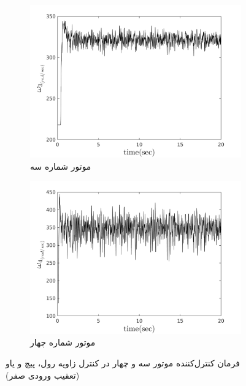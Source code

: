 \begin{figure}
	[width=12cm]
	\centering
	\begin{subfigure}
		\centering
		\includegraphics[width=12cm]{../Figures/MIL/LQIDG/Roll_Pitch/lqidg_roll_pitch_Omega_3.png}
		\caption{موتور شماره سه}
	\end{subfigure}
	\begin{subfigure}
		\centering
		\includegraphics[width=12cm]{../Figures/MIL/LQIDG/Roll_Pitch/lqidg_roll_pitch_Omega_4.png}
		\caption{موتور شماره چهار}
	\end{subfigure}
	\caption{‫‪فرمان کنترل‌کننده موتور سه و چهار در کنترل زاویه  رول، پیچ و یاو (تعقیب ورودی صفر)}
\end{figure}


